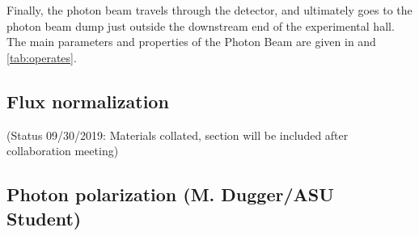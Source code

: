 Finally, the photon beam travels through the \GX{} detector, and
ultimately goes to the photon beam dump just outside the downstream
end of the experimental hall.
The main parameters and properties of the Photon Beam are given in and \ref{tab:operates}.




\subsection{Flux normalization \label{sec:fluxnorm}}
(Status 09/30/2019: Materials collated, section will be included after collaboration meeting)

\subsection{Photon polarization (M. Dugger/ASU Student)\label{sec:polarization}}